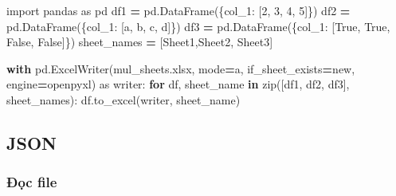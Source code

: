 \documentclass[
]{book}
\newenvironment{Shaded}{\begin{snugshade}}{\end{snugshade}}
\newcommand{\BuiltInTok}[1]{#1}
\newcommand{\ControlFlowTok}[1]{\textcolor[rgb]{0.13,0.29,0.53}{\textbf{#1}}}
\newcommand{\DecValTok}[1]{\textcolor[rgb]{0.00,0.00,0.81}{#1}}
\newcommand{\ImportTok}[1]{#1}
\newcommand{\KeywordTok}[1]{\textcolor[rgb]{0.13,0.29,0.53}{\textbf{#1}}}
\newcommand{\NormalTok}[1]{#1}
\newcommand{\OperatorTok}[1]{\textcolor[rgb]{0.81,0.36,0.00}{\textbf{#1}}}
\newcommand{\StringTok}[1]{\textcolor[rgb]{0.31,0.60,0.02}{#1}}
\newcommand{\VariableTok}[1]{\textcolor[rgb]{0.00,0.00,0.00}{#1}}
\begin{document}
\begin{Shaded}
\begin{Highlighting}[]
\ImportTok{import}\NormalTok{ pandas }\ImportTok{as}\NormalTok{ pd}
\NormalTok{df1 }\OperatorTok{=}\NormalTok{ pd.DataFrame(\{}\StringTok{\textquotesingle{}col\_1\textquotesingle{}}\NormalTok{: [}\DecValTok{2}\NormalTok{, }\DecValTok{3}\NormalTok{, }\DecValTok{4}\NormalTok{, }\DecValTok{5}\NormalTok{]\})}
\NormalTok{df2 }\OperatorTok{=}\NormalTok{ pd.DataFrame(\{}\StringTok{\textquotesingle{}col\_1\textquotesingle{}}\NormalTok{: [}\StringTok{\textquotesingle{}a\textquotesingle{}}\NormalTok{, }\StringTok{\textquotesingle{}b\textquotesingle{}}\NormalTok{, }\StringTok{\textquotesingle{}c\textquotesingle{}}\NormalTok{, }\StringTok{\textquotesingle{}d\textquotesingle{}}\NormalTok{]\})}
\NormalTok{df3 }\OperatorTok{=}\NormalTok{ pd.DataFrame(\{}\StringTok{\textquotesingle{}col\_1\textquotesingle{}}\NormalTok{: [}\VariableTok{True}\NormalTok{, }\VariableTok{True}\NormalTok{, }\VariableTok{False}\NormalTok{, }\VariableTok{False}\NormalTok{]\})}
\NormalTok{sheet\_names }\OperatorTok{=}\NormalTok{ [}\StringTok{\textquotesingle{}Sheet1\textquotesingle{}}\NormalTok{,}\StringTok{\textquotesingle{}Sheet2\textquotesingle{}}\NormalTok{, }\StringTok{\textquotesingle{}Sheet3\textquotesingle{}}\NormalTok{]}

\ControlFlowTok{with}\NormalTok{ pd.ExcelWriter(}\StringTok{\textquotesingle{}mul\_sheets.xlsx\textquotesingle{}}\NormalTok{, mode}\OperatorTok{=}\StringTok{\textquotesingle{}a\textquotesingle{}}\NormalTok{, if\_sheet\_exists}\OperatorTok{=}\StringTok{\textquotesingle{}new\textquotesingle{}}\NormalTok{, engine}\OperatorTok{=}\StringTok{\textquotesingle{}openpyxl\textquotesingle{}}\NormalTok{) }\ImportTok{as}\NormalTok{ writer:}
    \ControlFlowTok{for}\NormalTok{ df, sheet\_name }\KeywordTok{in} \BuiltInTok{zip}\NormalTok{([df1, df2, df3], sheet\_names):}
\NormalTok{        df.to\_excel(writer, sheet\_name)}
\end{Highlighting}
\end{Shaded}

\hypertarget{json}{%
\subsection{JSON}\label{json}}

\hypertarget{ux111ux1ecdc-file-1}{%
\subsubsection{Đọc file}\label{ux111ux1ecdc-file-1}}
\end{document}
